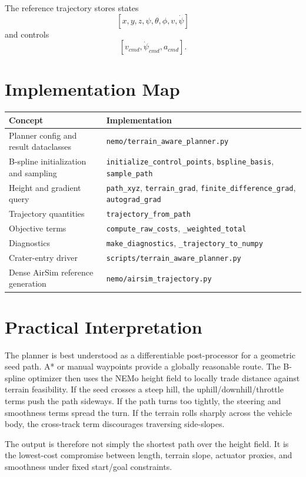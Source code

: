 \documentclass[11pt]{article}
\begin{document}
The reference trajectory stores states
\[
  [x,y,z,\psi,\theta,\phi,v,\dot{\psi}]
\]
and controls
\[
  [v_{cmd},\dot{\psi}_{cmd},a_{cmd}].
\]

\section{Implementation Map}

\begin{center}
\begin{tabular}{ll}
\toprule
Concept & Implementation \\
\midrule
Planner config and result dataclasses & \texttt{nemo/terrain\_aware\_planner.py} \\
B-spline initialization and sampling & \texttt{initialize\_control\_points}, \texttt{bspline\_basis}, \texttt{sample\_path} \\
Height and gradient query & \texttt{path\_xyz}, \texttt{terrain\_grad}, \texttt{finite\_difference\_grad}, \texttt{autograd\_grad} \\
Trajectory quantities & \texttt{trajectory\_from\_path} \\
Objective terms & \texttt{compute\_raw\_costs}, \texttt{\_weighted\_total} \\
Diagnostics & \texttt{make\_diagnostics}, \texttt{\_trajectory\_to\_numpy} \\
Crater-entry driver & \texttt{scripts/terrain\_aware\_planner.py} \\
Dense AirSim reference generation & \texttt{nemo/airsim\_trajectory.py} \\
\bottomrule
\end{tabular}
\end{center}

\section{Practical Interpretation}

The planner is best understood as a differentiable post-processor for a geometric seed path. A* or manual waypoints provide a globally reasonable route. The B-spline optimizer then uses the NEMo height field to locally trade distance against terrain feasibility. If the seed crosses a steep hill, the uphill/downhill/throttle terms push the path sideways. If the path turns too tightly, the steering and smoothness terms spread the turn. If the terrain rolls sharply across the vehicle body, the cross-track term discourages traversing side-slopes.

The output is therefore not simply the shortest path over the height field. It is the lowest-cost compromise between length, terrain slope, actuator proxies, and smoothness under fixed start/goal constraints.
\end{document}
